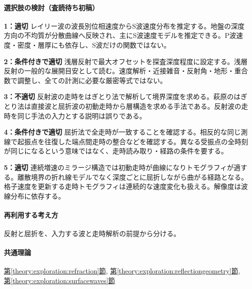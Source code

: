 \paragraph{選択肢の検討（査読待ち初稿）}\mbox{}\par

\noindent\textbf{1：適切} レイリー波の波長別位相速度からS波速度分布を推定する。地盤の深度方向の不均質が分散曲線へ反映され、主にS波速度モデルを推定できる。P波速度・密度・層厚にも依存し、S波だけの関数ではない。\par

\noindent\textbf{2：条件付きで適切} 浅層反射で最大オフセットを探査深度程度に設定する。浅層反射の一般的な展開目安として読む。速度解析・近接雑音・反射角・地形・重合数で調整し、全ての計測に必要な厳密等式ではない。\par

\noindent\textbf{3：不適切} 反射波の走時をはぎとり法で解析して境界深度を求める。萩原のはぎとり法は直接波と屈折波の初動走時から層構造を求める手法である。反射波の走時を同じ手法の入力とする説明は誤りである。\par

\noindent\textbf{4：条件付きで適切} 屈折法で全走時が一致することを確認する。相反的な同じ測線で起振点を往復した端点間走時の整合などを確認する。異なる受振点の全時刻が同じになるという意味ではなく、走時読み取り・経路の条件を要する。\par

\noindent\textbf{5：適切} 連続増速のミラージ構造では初動走時が曲線になりトモグラフィが適する。離散境界の折れ線モデルでなく深度ごとに屈折しながら曲がる経路となる。格子速度を更新する走時トモグラフィは連続的な速度変化も扱える。解像度は波線分布に依存する。\par

\paragraph{再利用する考え方} 反射と屈折を、入力する波と走時解析の前提から分ける。

\paragraph{共通理論} \hyperref[theory:exploration:refraction]{第\ref*{theory:exploration:refraction}節}, \hyperref[theory:exploration:reflectiongeometry]{第\ref*{theory:exploration:reflectiongeometry}節}, \hyperref[theory:exploration:surfacewaves]{第\ref*{theory:exploration:surfacewaves}節}

